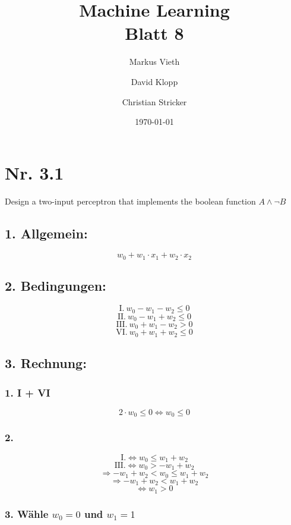 \documentclass[a4paper,11pt,twoside]{scrartcl}
\title{Machine Learning\\ Blatt 8}
\author{Markus Vieth\and David Klopp\and Christian Stricker}
\date{\today}
\begin{document}
\newcommand{\cor}[1]{\textcolor{red}{\textit{#1}}}
\maketitle
\cleardoublepage
\pagestyle{myheadings}

\newpage

\section*{Nr. 3.1}
Design a two-input perceptron that implements the boolean function $A \land \neg B$\\

\subsection*{1. Allgemein:} \[w_0 + w_1 \cdot x_1 + w_2 \cdot x_2\]

\subsection*{2. Bedingungen:}

\[\text{I.}~w_0 - w_1 - w_2 \leq 0 \]
\[\text{II.}~w_0 - w_1 + w_2 \leq 0 \]
\[\text{III.}~w_0 + w_1 - w_2 > 0 \]
\[\text{VI.}~w_0 + w_1 + w_2 \leq 0 \]

\subsection*{3. Rechnung:}

\subsubsection*{1. I + VI}
\[2 \cdot w_0 \leq 0 \Leftrightarrow w_0 \leq 0 \]

\subsubsection*{2.}
\[\text{I.} \Leftrightarrow w_0 \leq w_1 + w_2\]
\[\text{III.} \Leftrightarrow w_0 > -w_1 + w_2\]
\[\Rightarrow -w_1 + w_2 <  w_0 \leq w_1 + w_2\]
\[\Rightarrow -w_1 + w_2 < w_1 + w_2\]
\[ \Leftrightarrow w_1 > 0\]

\subsubsection*{3. Wähle $w_0 = 0$ und $w_1 = 1$}
\end{document}
